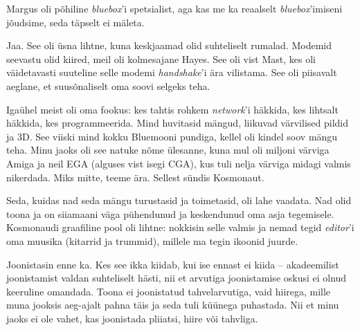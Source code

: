 Margus 
oli põhiline \emph{bluebox}'i spetsialist, aga kas me ka reaalselt 
\emph{bluebox}'imiseni jõudsime, seda täpselt ei mäleta.


Jaa. See oli üsna lihtne, kuna 
keskjaamad olid suhteliselt rumalad. Modemid seevastu olid kiired, meil oli kolmesajane Hayes. See oli vist
Mast, kes oli väidetavasti suuteline selle modemi 
\emph{handshake}'i ära vilistama. See oli piisavalt aeglane, et
suusõnaliselt oma soovi selgeks teha.

Igaühel meist oli oma fookus: kes tahtis rohkem 
\emph{network}'i häkkida, kes lihtsalt häkkida, kes 
programmeerida. Mind huvitasid mängud, liikuvad värvilised 
pildid ja 3D. See viiski mind kokku
Bluemooni pundiga, kellel oli kindel soov mängu 
teha. Minu jaoks oli see natuke nõme ülesanne, kuna 
mul oli miljoni värviga Amiga ja neil 
EGA (alguses vist isegi CGA), kus tuli nelja värviga 
midagi valmis nikerdada. Miks mitte, teeme ära. Sellest sündis 
Kosmonaut. 

Seda, kuidas nad seda mängu turustasid ja toimetasid, oli lahe vaadata. Nad olid toona ja on siiamaani väga pühendunud ja keskendunud oma asja 
tegemisele. Kosmonaudi graafiline pool oli lihtne: nokkisin selle valmis ja nemad tegid 
\emph{editor}'i oma muusika (kitarrid ja trummid), millele ma tegin ikoonid juurde.


Joonistasin enne ka. Kes see ikka kiidab, kui ise ennast ei kiida – 
akadeemilist joonistamist valdan suhteliselt hästi, nii et arvutiga joonistamise oskusi 
ei olnud keeruline omandada. Toona ei joonistatud tahvelarvutiga,
vaid hiirega, mille muna jooksis aeg-ajalt pahna täis ja seda tuli
küünega puhastada. Nii et minu jaoks ei ole vahet, kas joonistada
pliiatsi, hiire või tahvliga.

